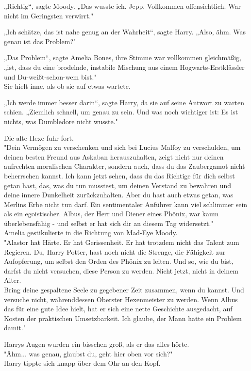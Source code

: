 {„Richtig“, sagte Moody. „Das wusste ich. Jepp. Vollkommen offensichtlich. War nicht im Geringsten verwirrt."

„Ich schätze, das ist nahe genug an der Wahrheit“, sagte Harry. „Also, ähm. Was genau ist das Problem?"

„Das Problem“, sagte Amelia Bones, ihre Stimme war vollkommen gleichmäßig, „ist, dass du eine brodelnde, instabile Mischung aus einem Hogwarts-Erstklässler und Du-weißt-schon-wem bist."\\ Sie hielt inne, als ob sie auf etwas wartete.

„Ich werde immer besser darin“, sagte Harry, da sie auf seine Antwort zu warten schien. „Ziemlich schnell, um genau zu sein. Und was noch wichtiger ist: Es ist nichts, was Dumbledore nicht wusste."

Die alte Hexe fuhr fort.\\ "Dein Vermögen zu verschenken und sich bei Lucius Malfoy zu verschulden, um deinen besten Freund aus Askaban herauszuhalten, zeigt nicht nur deinen aufrechten moralischen Charakter, sondern auch, dass du das Zaubergamot nicht beherrschen kannst. Ich kann jetzt sehen, dass du das Richtige für dich selbst getan hast, das, was du tun musstest, um deinen Verstand zu bewahren und deine innere Dunkelheit zurückzuhalten. Aber du hast auch etwas getan, was Merlins Erbe nicht tun darf. Ein sentimentaler Anführer kann viel schlimmer sein als ein egoistischer. Albus, der Herr und Diener eines Phönix, war kaum überlebensfähig - und selbst er hat sich dir an diesem Tag widersetzt."\\ Amelia gestikulierte in die Richtung von Mad-Eye Moody.\\ "Alastor hat Härte. Er hat Gerissenheit. Er hat trotzdem nicht das Talent zum Regieren. Du, Harry Potter, hast noch nicht die Strenge, die Fähigkeit zur Aufopferung, um selbst den Orden des Phönix zu leiten. Und so, wie du bist, darfst du nicht versuchen, diese Person zu werden. Nicht jetzt, nicht in deinem Alter.\\ Bring deine gespaltene Seele zu gegebener Zeit zusammen, wenn du kannst. Und versuche nicht, währenddessen Oberster Hexenmeister zu werden. Wenn Albus das für eine gute Idee hielt, hat er sich eine nette Geschichte ausgedacht, auf Kosten der praktischen Umsetzbarkeit. Ich glaube, der Mann hatte ein Problem damit."

Harrys Augen wurden ein bisschen groß, als er das alles hörte.\\ "Ähm... was genau, glaubst du, geht hier oben vor sich?"\\ Harry tippte sich knapp über dem Ohr an den Kopf.

}

